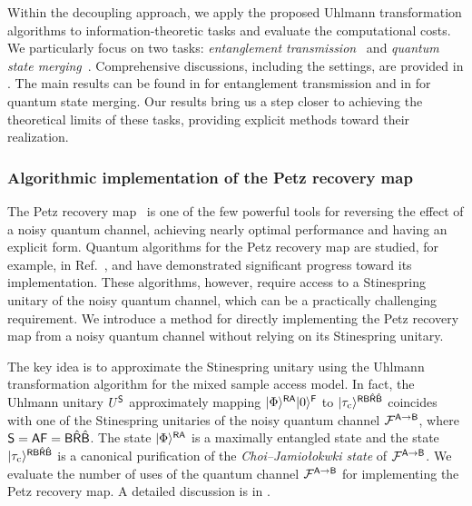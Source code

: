Within the decoupling approach, we apply the proposed Uhlmann transformation algorithms to information-theoretic tasks and evaluate the computational costs. 
We particularly focus on two tasks: \emph{entanglement transmission}~\cite{Schumacher1996sendingentanglement, schumacher2001approximateerrorcorrection, hayden2007black, datta2013oneshotentassistQCcom, beigi2016decoding, khatri2024principlemodern} and \emph{quantum state merging}~\cite{Horodecki2005Partialquantinfo, berta2008singleshot, dupuis2014one, yamasaki2019statemergesmalldimension}.
Comprehensive discussions, including the settings, are provided in .
The main results can be found in  for entanglement transmission and in  for quantum state merging.
Our results bring us a step closer to achieving the theoretical limits of these tasks, providing explicit methods toward their realization.





\subsubsection{Algorithmic implementation of the Petz recovery map}
\label{sec:overview of petz}


The Petz recovery map~\cite{petz1986sufficient, petz1988sufficiency} is one of the few powerful tools for reversing the effect of a noisy quantum channel, achieving nearly optimal performance and having an explicit form.
Quantum algorithms for the Petz recovery map are studied, for example, in Ref.~\cite{gilyen2022petzmap, biswas2023noiseadapted}, and have demonstrated significant progress toward its implementation.
These algorithms, however, require access to a Stinespring unitary of the noisy quantum channel, which can be a practically challenging requirement.
We introduce a method for directly implementing the Petz recovery map from a noisy quantum channel without relying on its Stinespring unitary.

The key idea is to approximate the Stinespring unitary using the Uhlmann transformation algorithm for the mixed sample access model. 
In fact, the Uhlmann unitary $U^{\mathsf{S}}$ approximately mapping $|\Phi\rangle^{{\mathsf{R}}{\mathsf{A}}}|0\rangle^{{\mathsf{F}}}$ to $|\tau_{\rm c}\rangle^{{\mathsf{R}}{\mathsf{B}}\hat{{\mathsf{R}}}\hat{{\mathsf{B}}}}$ coincides with one of the Stinespring unitaries of the noisy quantum channel ${\mathcal{F}}^{{\mathsf{A}}\rightarrow{\mathsf{B}}}$, where ${\mathsf{S}}={\mathsf{A}}{\mathsf{F}} = {\mathsf{B}}\hat{{\mathsf{R}}}\hat{{\mathsf{B}}}$.
The state $|\Phi\rangle^{{\mathsf{R}}{\mathsf{A}}}$ is a maximally entangled state and the state $|\tau_{\rm c}\rangle^{{\mathsf{R}}{\mathsf{B}}\hat{{\mathsf{R}}}\hat{{\mathsf{B}}}}$ is a canonical purification of the \emph{Choi--Jamio\l okwki state} of ${\mathcal{F}}^{{\mathsf{A}}\rightarrow{\mathsf{B}}}$. 
We evaluate the number of uses of the quantum channel ${\mathcal{F}}^{{\mathsf{A}}\rightarrow{\mathsf{B}}}$ for implementing the Petz recovery map.
A detailed discussion is in .








